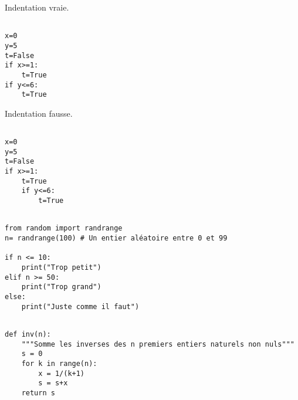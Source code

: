 \exer{}
\setcounter{numques}{0}

\question{} 
Indentation vraie.
\begin{lstlisting}

x=0
y=5
t=False
if x>=1:
    t=True
if y<=6:
    t=True
\end{lstlisting}

Indentation fausse.
\begin{lstlisting}

x=0
y=5
t=False
if x>=1:
    t=True
    if y<=6:
        t=True
\end{lstlisting}




\medskip{}


\question{} 
\begin{lstlisting}

from random import randrange
n= randrange(100) # Un entier aléatoire entre 0 et 99

if n <= 10:
    print("Trop petit")
elif n >= 50:
    print("Trop grand")
else:
    print("Juste comme il faut")
\end{lstlisting}



\medskip{}

\question{} 
\begin{lstlisting}

def inv(n):
    """Somme les inverses des n premiers entiers naturels non nuls"""
    s = 0
    for k in range(n):
        x = 1/(k+1)
        s = s+x
    return s
\end{lstlisting}
